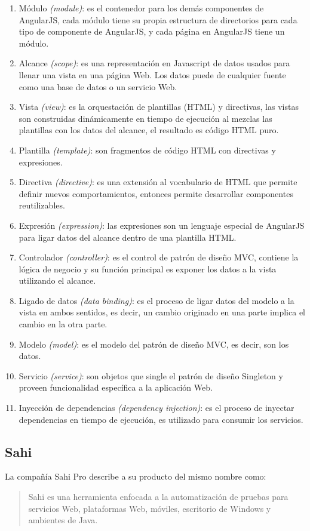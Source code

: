 \begin{enumerate}
	\item Módulo \textit{(module)}: es el contenedor para los demás componentes de AngularJS, cada módulo tiene su propia estructura de directorios para cada tipo de componente de AngularJS, y cada página en AngularJS tiene un módulo.
	\item Alcance \textit{(scope)}: es una representación en Javascript de datos usados para llenar una vista en una página Web. Los datos puede de cualquier fuente como una base de datos o un servicio Web.
	\item Vista \textit{(view)}: es la orquestación de plantillas (HTML) y directivas, las vistas son construidas dinámicamente en tiempo de ejecución al mezclas las plantillas con los datos del alcance, el resultado es código HTML puro.
	\item Plantilla \textit{(template)}: son fragmentos de código HTML con directivas y expresiones.
	\item Directiva \textit{(directive)}: es una extensión al vocabulario de HTML que permite definir nuevos comportamientos, entonces permite desarrollar componentes reutilizables.
	\item Expresión \textit{(expression)}: las expresiones son un lenguaje especial de AngularJS para ligar datos del alcance dentro de una plantilla HTML.
	\item Controlador \textit{(controller)}: es el control de patrón de diseño MVC, contiene la lógica de negocio y su función principal es exponer los datos a la vista utilizando el alcance.
	\item Ligado de datos \textit{(data binding)}: es el proceso de ligar datos del modelo a la vista en ambos sentidos, es decir, un cambio originado en una parte implica el cambio en la otra parte.
	\item Modelo \textit{(model)}: es el modelo del patrón de diseño MVC, es decir, son los datos.
	\item Servicio \textit{(service)}: son objetos que single el patrón de diseño Singleton y proveen funcionalidad específica a la aplicación Web.
	\item Inyección de dependencias \textit{(dependency injection)}: es el proceso de inyectar dependencias en tiempo de ejecución, es utilizado para consumir los servicios.
\end{enumerate}

\subsection{Sahi}\label{sec:sahi}
La compañía Sahi Pro\textsuperscript{\textcopyright}\cite{SahiPro} describe a su producto del mismo nombre como:
\begin{quote}
	Sahi es una herramienta enfocada a la automatización de pruebas para servicios Web, plataformas Web, móviles, escritorio de Windows\textsuperscript{\textcopyright} y ambientes de Java.
\end{quote}

